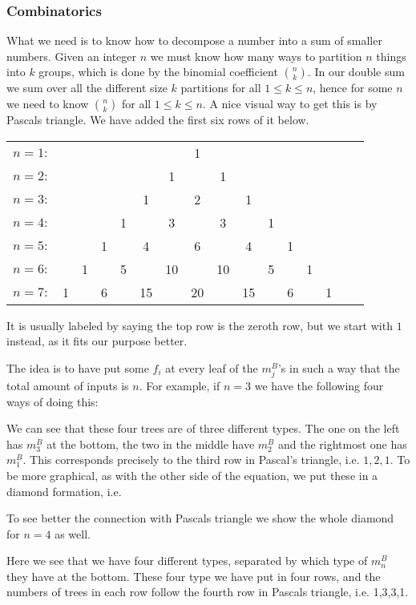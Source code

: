 \subsubsection{Combinatorics}

What we need is to know how to decompose a number into a sum of smaller numbers. Given an integer $n$ we must know how many ways to partition $n$ things into $k$ groups, which is done by the binomial coefficient $\binom{n}{k}$. In our double sum we sum over all the different size $k$ partitions for all $1\leq k\leq n$, hence for some $n$ we need to know $\binom{n}{k}$ for all $1\leq k\leq n$. A nice visual way to get this is by Pascals triangle. We have added the first six rows of it below.

\begin{center}
\begin{tabular}{lccccccccccccccc}
$n=1 \colon$ &&&&&&&1&&&&&&\\
$n=2 \colon$ &&&&&&1&&1&&&&&\\
$n=3 \colon$ &&&&&1&&2&&1&&&&\\
$n=4 \colon$ &&&&1&&3&&3&&1&&&\\
$n=5 \colon$ &&&1&&4&&6&&4&&1&&\\
$n=6 \colon$ &&1&&5&&10&&10&&5&&1&\\
$n=7 \colon$ &1&&6&&15&&20&&15&&6&&1
\end{tabular}
\end{center}

It is usually labeled by saying the top row is the zeroth row, but we start with $1$ instead, as it fits our purpose better. 

The idea is to have put some $f_i$ at every leaf of the $m_j^B$'s in such a way that the total amount of inputs is $n$. For example, if $n=3$ we have the following four ways of doing this:


We can see that these four trees are of three different types. The one on the left has $m_3^B$ at the bottom, the two in the middle have $m_2^B$ and the rightmost one has $m_1^B$. This corresponds precisely to the third row in Pascal's triangle, i.e. $1, 2, 1$. To be more graphical, as with the other side of the equation, we put these in a diamond formation, i.e.



To see better the connection with Pascals triangle we show the whole diamond for $n=4$ as well.

Here we see that we have four different types, separated by which type of $m_n^B$ they have at the bottom. These four type we have put in four rows, and the numbers of trees in each row follow the fourth row in Pascals triangle, i.e. 1,3,3,1. 

